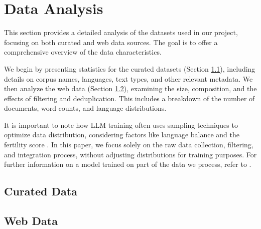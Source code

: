 \section{Data Analysis}
\label{sec:analysis}

This section provides a detailed analysis of the datasets used in our project, focusing on both curated and web data sources. The goal is to offer a comprehensive overview of the data characteristics.

We begin by presenting statistics for the curated datasets (Section \ref{sec:analysis.curated}), including details on corpus names, languages, text types, and other relevant metadata. We then analyze the web data (Section \ref{sec:analysis.web}), examining the size, composition, and the effects of filtering and deduplication. This includes a breakdown of the number of documents, word counts, and language distributions.

It is important to note how LLM training often uses sampling techniques to optimize data distribution, considering factors like language balance and the fertility score \cite{ali_mehdi_etal_2024}. 
In this paper, we focus solely on the raw data collection, filtering, and integration process, without adjusting distributions for training purposes. For further information on a model trained on part of the data we process, refer to \cite{opengpt_x_2024_13866365}.


\subsection{Curated Data}
\label{sec:analysis.curated}




 
\subsection{Web Data}
\label{sec:analysis.web}
%


